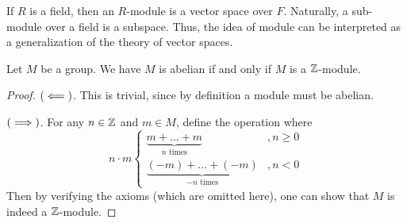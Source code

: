 \medskip

\begin{re}
    If $R$ is a field, then an $R$-module is a vector space over $F$. Naturally, a sub-module over a field is a subspace. Thus, the idea of module can be interpreted as a generalization of the theory of vector spaces.
\end{re}

\medskip

\begin{pro}
    Let $M$ be a group. We have $M$ is abelian if and only if $M$ is a ${\mathbb Z}$-module.
\end{pro}
\begin{proof}
    $\left(\impliedby\right)$. This is trivial, since by definition a module must be abelian.

    $\left(\implies\right)$. For any $n\in {\mathbb Z}$ and $m\in M$, define the operation where
    \[n\cdot m 
    \begin{cases}
        \underbrace{m+\dots +m}_{n \text{ times}} &, n\geq 0\\
        \underbrace{(-m)+\dots +(-m)}_{-n \text{ times}} &, n< 0
    \end{cases}\]
    Then by verifying the axioms (which are omitted here), one can show that $M$ is indeed a ${\mathbb Z}$-module.
\end{proof}

\medskip

